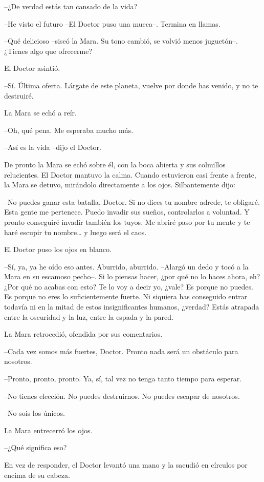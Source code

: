 --¿De verdad estás tan cansado de la vida?

--He visto el futuro --El Doctor puso una mueca--. Termina en llamas.

--Qué delicioso --siseó la Mara. Su tono cambió, se volvió menos juguetón--. ¿Tienes algo que ofrecerme?

El Doctor asintió.

--Sí. Última oferta. Lárgate de este planeta, vuelve por donde has venido, y no te destruiré.

La Mara se echó a reír.

--Oh, qué pena. Me esperaba mucho más.

--Así es la vida --dijo el Doctor.

De pronto la Mara se echó sobre él, con la boca abierta y sus colmillos relucientes. El Doctor mantuvo la calma. Cuando estuvieron casi frente a frente, la Mara se detuvo, mirándolo directamente a los ojos. Silbantemente dijo:

--No puedes ganar esta batalla, Doctor. Si no dices tu nombre adrede, te obligaré. Esta gente me pertenece. Puedo invadir sus sueños, controlarlos a voluntad. Y pronto conseguiré invadir también los tuyos. Me abriré paso por tu mente y te haré escupir tu nombre… y luego será el caos.

El Doctor puso los ojos en blanco.

--Sí, ya, ya he oído eso antes. Aburrido, aburrido. --Alargó un dedo y tocó a la Mara en su escamoso pecho--. Si lo piensas hacer, ¿por qué no lo haces ahora, eh? ¿Por qué no acabas con esto? Te lo voy a decir yo, ¿vale? Es porque no puedes. Es porque no eres lo suficientemente fuerte. Ni siquiera has conseguido entrar todavía ni en la mitad de estos insignificantes humanos, ¿verdad? Estás atrapada entre la oscuridad y la luz, entre la espada y la pared.

La Mara retrocedió, ofendida por sus comentarios.

--Cada vez somos más fuertes, Doctor. Pronto nada será un obstáculo para nosotros.

--Pronto, pronto, pronto. Ya, sí, tal vez no tenga tanto tiempo para esperar.

--No tienes elección. No puedes destruirnos. No puedes escapar de nosotros.

--No sois los únicos.

La Mara entrecerró los ojos.

--¿Qué significa eso?

En vez de responder, el Doctor levantó una mano y la sacudió en círculos por encima de su cabeza.


